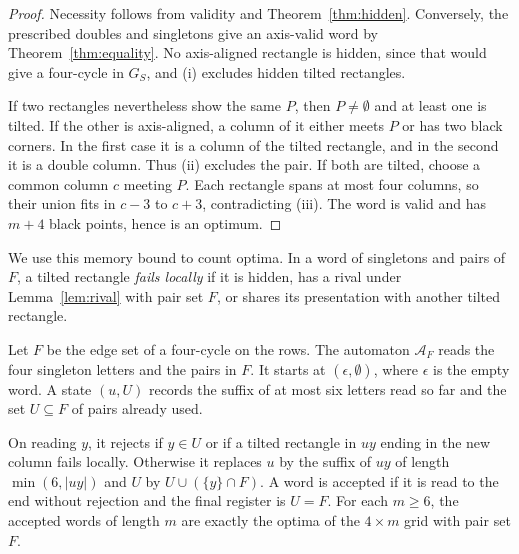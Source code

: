 \begin{proof}
Necessity follows from validity and Theorem~\ref{thm:hidden}.
Conversely, the prescribed doubles and singletons give an axis-valid
word by Theorem~\ref{thm:equality}. No axis-aligned rectangle is hidden,
since that would give a four-cycle in $G_S$, and (i) excludes hidden
tilted rectangles.

If two rectangles nevertheless show the same $P$, then
$P\ne\emptyset$ and at least one is tilted. If the other is
axis-aligned, a column of it either meets $P$ or has two black corners.
In the first case it is a column of the tilted rectangle, and in the
second it is a double column. Thus (ii) excludes the pair.
If both are tilted, choose a common column $c$ meeting $P$.
Each rectangle spans at most four columns, so their union fits in
$c-3$ to $c+3$, contradicting (iii). The word is valid and has
$m+4$ black points, hence is an optimum.
\end{proof}

We use this memory bound to count optima. In a word of singletons and pairs
of $F$, a tilted rectangle \emph{fails locally} if it is hidden, has a rival
under Lemma~\ref{lem:rival} with pair set $F$, or shares its presentation
with another tilted rectangle.

\begin{proposition}\label{prop:fourautomaton}
Let $F$ be the edge set of a four-cycle on the rows. The automaton $\mathcal A_F$ reads
the four singleton letters and the pairs in $F$. It starts at $(\epsilon,\emptyset)$,
where $\epsilon$ is the empty word. A state $(u,U)$ records the suffix of at most six
letters read so far and the set $U\subseteq F$ of pairs already used.

On reading $y$, it rejects if $y\in U$ or if a tilted rectangle in $uy$ ending in the
new column fails locally. Otherwise it replaces $u$ by the suffix of $uy$ of length
$\min(6,|uy|)$ and $U$ by $U\cup(\{y\}\cap F)$. A word is accepted if it is read to the end
without rejection and the final register is $U=F$. For each $m\ge6$, the accepted words
of length $m$ are exactly the optima of the $4\times m$ grid with pair set $F$.
\end{proposition}

